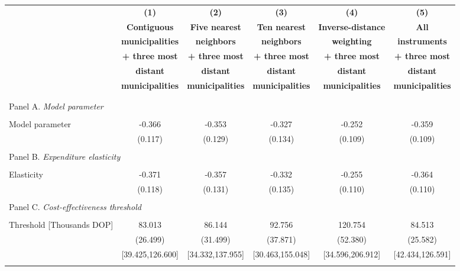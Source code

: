 \begin{tabular}{l c c c c c }
\toprule[1.5pt]
\multicolumn{1}{c}{\textbf{}} & \textbf{(1)} & \textbf{(2)} & \textbf{(3)} & \textbf{(4)}  & \textbf{(5)}   \\
\multicolumn{1}{c}{\textbf{}} & \textbf{Contiguous} & \textbf{Five nearest} & \textbf{Ten nearest} & \textbf{Inverse-distance}   & \textbf{All}  \\
\multicolumn{1}{c}{\textbf{}} & \textbf{municipalities} & \textbf{neighbors} & \textbf{neighbors} & \textbf{weighting}  &  \textbf{instruments}  \\
\multicolumn{1}{c}{\textbf{}} & \textbf{+ three most} & \textbf{+ three most} & \textbf{+ three most} & \textbf{+ three most}  &  \textbf{+ three most}  \\
\multicolumn{1}{c}{\textbf{}} & \textbf{distant} & \textbf{distant} & \textbf{distant} & \textbf{distant}  &  \textbf{distant}  \\
\multicolumn{1}{c}{\textbf{}} & \textbf{municipalities} & \textbf{municipalities} & \textbf{municipalities} & \textbf{municipalities}  &  \textbf{municipalities}  \\ \hline \\
\\
\multicolumn{6}{l}{Panel A. \textit{Model parameter}}\\
\\
Model parameter & -0.366 & -0.353 & -0.327 & -0.252 & -0.359  \\
& (0.117) & (0.129)  & (0.134) & (0.109) & (0.109)  \\
\\
\multicolumn{6}{l}{Panel B. \textit{Expenditure elasticity}}\\
\\
Elasticity & -0.371 & -0.357 & -0.332 & -0.255 & -0.364  \\
& (0.118) & (0.131)  & (0.135) & (0.110)  & (0.110) \\
\\
\multicolumn{6}{l}{Panel C. \textit{Cost-effectiveness threshold}}\\
\\
Threshold [Thousands DOP] & 83.013 & 86.144  & 92.756 & 120.754  & 84.513 \\
& (26.499) & (31.499) & (37.871) & (52.380) & (25.582)  \\
& [39.425,126.600] & [34.332,137.955]  & [30.463,155.048]  & [34.596,206.912] & [42.434,126.591]   \\
\\
\midrule[1 pt]

\end{tabular}
